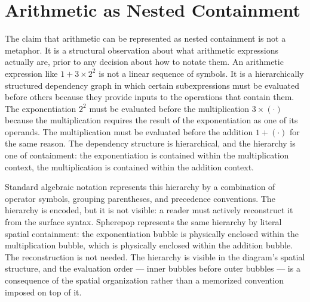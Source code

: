 \documentclass[12pt,openany]{book}
\theoremstyle{plain}
\theoremstyle{definition}
\theoremstyle{remark}
\begin{document}
\section{Arithmetic as Nested Containment}

The claim that arithmetic can be represented as nested containment is not a metaphor. It is a structural observation about what arithmetic expressions actually are, prior to any decision about how to notate them. An arithmetic expression like $1 + 3 \times 2^2$ is not a linear sequence of symbols. It is a hierarchically structured dependency graph in which certain subexpressions must be evaluated before others because they provide inputs to the operations that contain them. The exponentiation $2^2$ must be evaluated before the multiplication $3 \times (\cdot)$ because the multiplication requires the result of the exponentiation as one of its operands. The multiplication must be evaluated before the addition $1 + (\cdot)$ for the same reason. The dependency structure is hierarchical, and the hierarchy is one of containment: the exponentiation is contained within the multiplication context, the multiplication is contained within the addition context.

Standard algebraic notation represents this hierarchy by a combination of operator symbols, grouping parentheses, and precedence conventions. The hierarchy is encoded, but it is not visible: a reader must actively reconstruct it from the surface syntax. Spherepop represents the same hierarchy by literal spatial containment: the exponentiation bubble is physically enclosed within the multiplication bubble, which is physically enclosed within the addition bubble. The reconstruction is not needed. The hierarchy is visible in the diagram's spatial structure, and the evaluation order — inner bubbles before outer bubbles — is a consequence of the spatial organization rather than a memorized convention imposed on top of it.
\end{document}
